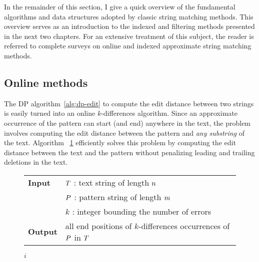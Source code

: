 In the remainder of this section, I give a quick overview of the fundamental algorithms and data structures adopted by classic string matching methods.
This overview serves as an introduction to the indexed and filtering methods presented in the next two chapters.
For an extensive treatment of this subject, the reader is referred to complete surveys on online \citep{Navarro2001a} and indexed \citep{Navarro2001} approximate string matching methods.


\subsection{Online methods}
\label{sub:introonline}


The DP algorithm~\ref{alg:dp-edit} to compute the edit distance between two strings is easily turned into an online $k$-differences algorithm.
Since an approximate occurrence of the pattern can start (and end) anywhere in the text, the problem involves computing the edit distance between the pattern and \emph{any substring} of the text.
Algorithm ~\ref{alg:dp-kdiff} efficiently solves this problem by computing the edit distance between the text and the pattern without penalizing leading and trailing deletions in the text.

\begin{figure*}[b]
\begin{center}
\begin{minipage}[t]{.9\textwidth}
\begin{algorithm}[H]
\begin{tabular}{ll}
\textbf{Input}  & $T$ : text string of length $n$\\
				& $P$ : pattern string of length $m$\\
				& $k$ : integer bounding the number of errors\\
\textbf{Output} & all end positions of $k$-differences occurrences of $P$ in $T$\\
\end{tabular}
\begin{algorithmic}[1]
\EndFor
{}
	\EndFor
		\State \Report $i$
	\EndIf
\EndFor
\end{algorithmic}
\label{alg:dp-kdiff}
\end{algorithm}
\end{minipage}
\end{center}
\end{figure*}

